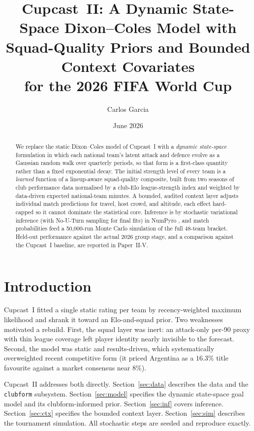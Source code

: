 \documentclass[11pt]{article}
\title{Cupcast~II: A Dynamic State-Space Dixon--Coles Model with\\
Squad-Quality Priors and Bounded Context Covariates\\for the 2026 FIFA World Cup}
\author{Carlos Garcia}
\date{June 2026}
\begin{document}
\maketitle

\begin{abstract}
We replace the static Dixon--Coles model of Cupcast~I with a \emph{dynamic
state-space} formulation in which each national team's latent attack and
defence evolve as a Gaussian random walk over quarterly periods, so that form
is a first-class quantity rather than a fixed exponential decay. The initial
strength level of every team is a \emph{learned} function of a lineup-aware
squad-quality composite, built from two seasons of club performance data
normalised by a club-Elo league-strength index and weighted by data-driven
expected national-team minutes. A bounded, audited context layer adjusts
individual match predictions for travel, host crowd, and altitude, each effect
hard-capped so it cannot dominate the statistical core. Inference is by
stochastic variational inference (with No-U-Turn sampling for final fits) in
NumPyro \cite{phan2019numpyro}, and match probabilities feed a 50{,}000-run
Monte Carlo simulation of the full 48-team bracket. Held-out performance against
the actual 2026 group stage, and a comparison against the Cupcast~I baseline,
are reported in Paper~II-V.
\end{abstract}

\section{Introduction}
Cupcast~I \cite{dixoncoles1997} fitted a single static rating per team by
recency-weighted maximum likelihood and shrank it toward an Elo-and-squad prior.
Two weaknesses motivated a rebuild. First, the squad layer was inert: an
attack-only per-90 proxy with thin league coverage left player identity nearly
invisible to the forecast. Second, the model was static and results-driven,
which systematically overweighted recent competitive form (it priced Argentina
as a $16.3\%$ title favourite against a market consensus near $8\%$).

Cupcast~II addresses both directly. Section~\ref{sec:data} describes the data
and the \texttt{clubform} subsystem. Section~\ref{sec:model} specifies the
dynamic state-space goal model and its clubform-informed prior.
Section~\ref{sec:inf} covers inference. Section~\ref{sec:ctx} specifies the
bounded context layer. Section~\ref{sec:sim} describes the tournament
simulation. All stochastic steps are seeded and reproduce exactly.
\end{document}
